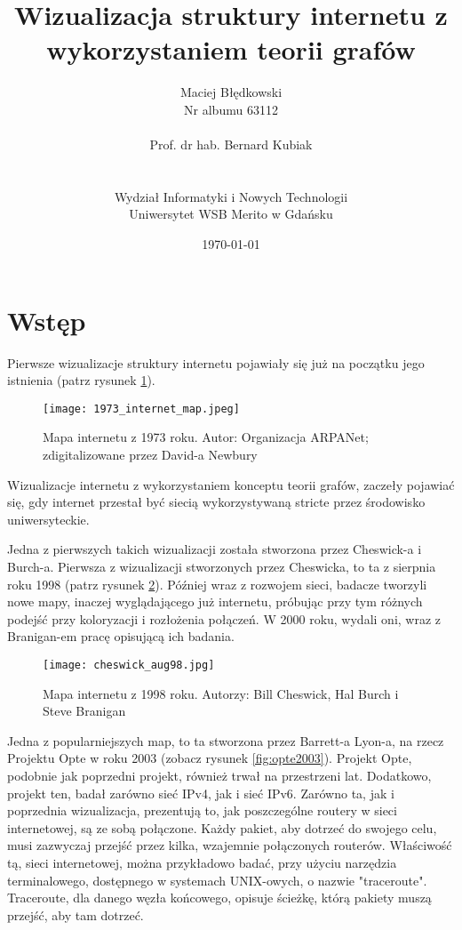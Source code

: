 \documentclass[a4paper, 12pt]{article}
\title{Wizualizacja struktury internetu z wykorzystaniem teorii grafów}
\author{Maciej Błędkowski \\ Nr albumu 63112 \\ \\ Prof. dr hab. Bernard Kubiak \\ \\ \\ Wydział Informatyki i Nowych Technologii \\ Uniwersytet WSB Merito w Gdańsku}
\date{\today}
\begin{document}

\maketitle

\tableofcontents

\section{Wstęp}

Pierwsze wizualizacje struktury internetu pojawiały się już na początku jego istnienia (patrz rysunek \ref{fig:1973_internet_map}).

\begin{figure}[H]
	\center
	\texttt{[image: 1973\_internet\_map.jpeg]}
	\caption{Mapa internetu z 1973 roku. Autor: Organizacja ARPANet; zdigitalizowane przez David-a Newbury\cite{arpaNetworkMap1973}}
	\label{fig:1973_internet_map}
\end{figure}

Wizualizacje internetu z wykorzystaniem konceptu teorii grafów, zaczeły pojawiać się, gdy internet przestał być siecią wykorzystywaną stricte przez środowisko uniwersyteckie.

Jedna z pierwszych takich wizualizacji została stworzona przez Cheswick-a i Burch-a. Pierwsza z wizualizacji stworzonych przez Cheswicka, to ta z sierpnia roku 1998 (patrz rysunek \ref{fig:cheswick1998}). Później wraz z rozwojem sieci, badacze tworzyli nowe mapy, inaczej wyglądającego już internetu, próbując przy tym różnych podejść przy koloryzacji i rozłożenia połączeń.\cite{cheswickInternetMappingProject} W 2000 roku, wydali oni, wraz z Branigan-em pracę opisującą ich badania.\cite{cheswick2000Mapping}

\begin{figure}[H]
	\center
	\texttt{[image: cheswick\_aug98.jpg]}
	\caption{Mapa internetu z 1998 roku. Autorzy: Bill Cheswick, Hal Burch i Steve Branigan\cite{cheswickInternetMappingProject}\cite{cheswick2000Mapping}}
	\label{fig:cheswick1998}
\end{figure}

Jedna z popularniejszych map, to ta stworzona przez Barrett-a Lyon-a, na rzecz Projektu Opte w roku 2003 (zobacz rysunek \ref{fig:opte2003}). Projekt Opte, podobnie jak poprzedni projekt, również trwał na przestrzeni lat. Dodatkowo, projekt ten, badał zarówno sieć IPv4, jak i sieć IPv6.\cite{lyonInternet} Zarówno ta, jak i poprzednia wizualizacja, prezentują to, jak poszczególne routery w sieci internetowej, są ze sobą połączone. Każdy pakiet, aby dotrzeć do swojego celu, musi zazwyczaj przejść przez kilka, wzajemnie połączonych routerów. Właściwość tą, sieci internetowej, można przykładowo badać, przy użyciu narzędzia terminalowego, dostępnego w systemach UNIX-owych, o nazwie "traceroute". Traceroute, dla danego węzła końcowego, opisuje ścieżkę, którą pakiety muszą przejść, aby tam dotrzeć.\cite{tracerouteLinuxMan}
\end{document}
